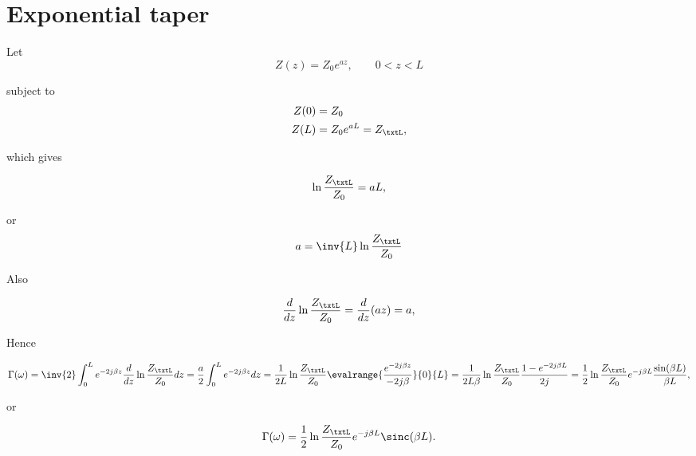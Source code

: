 \section{Exponential taper}

Let
\begin{equation}\label{eqn:continuumAndOtherTransformersCore:620}
Z(z) = Z_0 e^{a z}, \qquad 0 < z < L
\end{equation}

subject to
\begin{equation}\label{eqn:continuumAndOtherTransformersCore:640}
\begin{aligned}
Z(0) &= Z_0 \\
Z(L) &= Z_0 e^{a L} = Z_\txtL,
\end{aligned}
\end{equation}

which gives

\begin{equation}\label{eqn:continuumAndOtherTransformersCore:660}
\ln \frac{Z_\txtL}{Z_0} = a L,
\end{equation}

or
\begin{equation}\label{eqn:continuumAndOtherTransformersCore:680}
a = \inv{L} \ln \frac{Z_\txtL}{Z_0}
\end{equation}

Also 

\begin{equation}\label{eqn:continuumAndOtherTransformersCore:700}
\frac{d}{dz} \ln \frac{Z_\txtL}{Z_0} 
= \frac{d}{dz} (az)
= a,
\end{equation}

Hence 

\begin{dmath}\label{eqn:continuumAndOtherTransformersCore:740}
\Gamma(\omega) 
= \inv{2} \int_0^L e^{-2 j \beta z} \frac{d}{dz} \ln \frac{Z_\txtL}{Z_0} dz
= \frac{a}{2} 
\int_0^L e^{-2 j \beta z} dz 
= \frac{1}{2L} \ln \frac{Z_\txtL}{Z_0}
\evalrange{ \frac{e^{-2 j \beta z} }{ -2 j \beta} }{0}{L}
= \frac{1}{2L \beta} \ln \frac{Z_\txtL}{Z_0}
\frac{ 1 - e^{-2 j \beta L} }{2 j}
= \frac{1}{2} \ln \frac{Z_\txtL}{Z_0} e^{-j \beta L} \frac{\sin( \beta L )}{\beta L},
\end{dmath}

or

\begin{dmath}\label{eqn:continuumAndOtherTransformersCore:940}
\Gamma(\omega) = \frac{1}{2} \ln \frac{Z_\txtL}{Z_0} e^{-j \beta L} \sinc( \beta L ).
\end{dmath}

